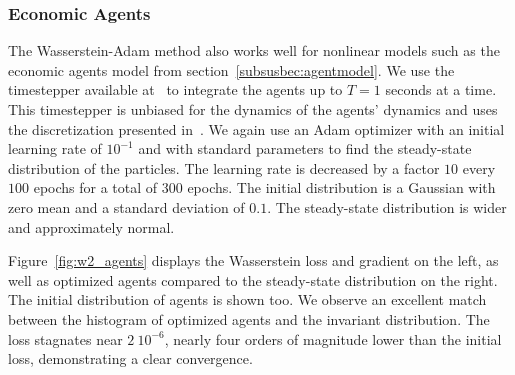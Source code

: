 \documentclass{article}
\begin{document}
\subsubsection{Economic Agents} \label{subsubsec:w2_agents}
The Wasserstein-Adam method also works well for nonlinear models such as the economic agents model from section~\ref{subsusbec:agentmodel}. We use the timestepper available at~\cite{} to integrate the agents up to $T = 1$ seconds at a time. This timestepper is unbiased for the dynamics of the agents' dynamics and uses the discretization presented in~\cite{}. We again use an Adam optimizer with an initial learning rate of $10^{-1}$ and with standard parameters to find the steady-state distribution of the particles. The learning rate is decreased by a factor $10$ every $100$ epochs for a total of $300$ epochs. The initial distribution is a Gaussian with zero mean and a standard deviation of $0.1$. The steady-state distribution is wider and approximately normal.

Figure~\ref{fig:w2_agents} displays the Wasserstein loss and gradient on the left, as well as optimized agents compared to the steady-state distribution on the right. The initial distribution of agents is shown too. We observe an excellent match between the histogram of optimized agents and the invariant distribution. The loss stagnates near $2 \ 10^{-6}$, nearly four orders of magnitude lower than the initial loss, demonstrating a clear convergence.
\end{document}
